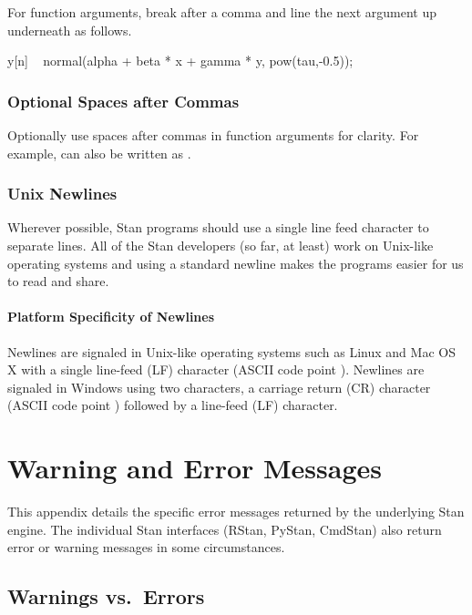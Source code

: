 For function arguments, break after a comma and line the next
argument up underneath as follows.
%
\begin{stancode}
y[n] ~ normal(alpha + beta * x + gamma * y,
              pow(tau,-0.5));
\end{stancode}
%

\subsection{Optional Spaces after Commas}

Optionally use spaces after commas in function arguments for clarity.
For example,  can also be
written as .



\subsection{Unix Newlines}

Wherever possible, Stan programs should use a single line feed 
character to separate lines.  All of the Stan developers (so far, at 
least) work on Unix-like operating systems and using a standard 
newline makes the programs easier for us to read and share.  

\subsubsection{Platform Specificity of Newlines}

Newlines are signaled in Unix-like operating systems such as Linux and
Mac OS X with a single line-feed (LF) character (ASCII code point
).  Newlines are signaled in Windows using two characters,
a carriage return (CR) character (ASCII code point )
followed by a line-feed (LF) character.

\chapter{Warning and Error Messages}\label{error-messages.appendix}

\noindent
This appendix details the specific error messages returned by the
underlying Stan engine.  The individual Stan interfaces (RStan,
PyStan, CmdStan) also return error or warning messages in some
circumstances.

\section{Warnings vs.\ Errors}

